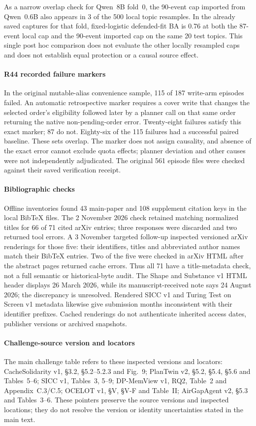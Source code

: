 As a narrow overlap check for Qwen~8B fold~0, the 90-event cap imported from Qwen~0.6B also appears in 3 of the 500 local topic resamples. In the already saved captures for that fold, fixed-logistic defended-fit BA is 0.76 at both the 87-event local cap and the 90-event imported cap on the same 20 test topics. This single post hoc comparison does not evaluate the other locally resampled caps and does not establish equal protection or a causal source effect.

\paragraph{R44 recorded failure markers}
In the original mutable-alias convenience sample, 115 of 187 write-arm episodes failed. An automatic retrospective marker requires a cover write that changes the selected order's eligibility followed later by a planner call on that same order returning the native non-pending-order error. Twenty-eight failures satisfy this exact marker; 87 do not. Eighty-six of the 115 failures had a successful paired baseline. These sets overlap. The marker does not assign causality, and absence of the exact error cannot exclude quota effects; planner deviation and other causes were not independently adjudicated. The original 561 episode files were checked against their saved verification receipt.

\paragraph{Bibliographic checks}
Offline inventories found 43 main-paper and 108 supplement citation keys in the local BibTeX files. The 2 November 2026 check retained matching normalized titles for 66 of 71 cited arXiv entries; three responses were discarded and two returned tool errors. A 3 November targeted follow-up inspected versioned arXiv renderings for those five: their identifiers, titles and abbreviated author names match their BibTeX entries. Two of the five were checked in arXiv HTML after the abstract pages returned cache errors. Thus all 71 have a title-metadata check, not a full semantic or historical-byte audit. The Shape and Substance v1 HTML header displays 26 March 2026, while its manuscript-received note says 24 August 2026; the discrepancy is unresolved. Rendered SICC v1 and Turing Test on Screen v1 metadata likewise give submission months inconsistent with their identifier prefixes. Cached renderings do not authenticate inherited access dates, publisher versions or archived snapshots.

\paragraph{Challenge-source version and locators}
The main challenge table refers to these inspected versions and locators: CacheSolidarity v1, \S3.2, \S5.2--5.2.3 and Fig.~9; PlanTwin v2, \S5.2, \S5.4, \S5.6 and Tables~5--6; SICC v1, Tables~3, 5--9; DP-MemView v1, RQ2, Table~2 and Appendix~C.3/C.5; OCELOT v1, \S V, \S V-F and Table~II; AirGapAgent v2, \S5.3 and Tables~3--6. These pointers preserve the source versions and inspected locations; they do not resolve the version or identity uncertainties stated in the main text.
